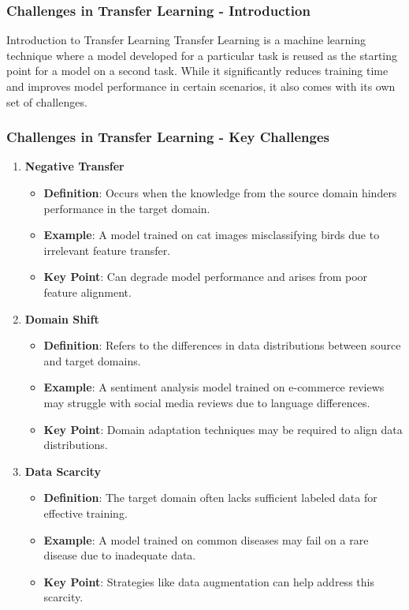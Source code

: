 \documentclass[aspectratio=169]{beamer}
\begin{document}
\begin{frame}[fragile]
  \frametitle{Challenges in Transfer Learning - Introduction}
  \begin{block}{Introduction to Transfer Learning}
    Transfer Learning is a machine learning technique where a model developed for a
    particular task is reused as the starting point for a model on a second task. 
    While it significantly reduces training time and improves model performance in
    certain scenarios, it also comes with its own set of challenges.
  \end{block}
\end{frame}

\begin{frame}[fragile]
  \frametitle{Challenges in Transfer Learning - Key Challenges}
  \begin{enumerate}
    \item \textbf{Negative Transfer}
      \begin{itemize}
        \item \textbf{Definition}: Occurs when the knowledge from the source domain
        hinders performance in the target domain.
        \item \textbf{Example}: A model trained on cat images misclassifying birds due 
        to irrelevant feature transfer.
        \item \textbf{Key Point}: Can degrade model performance and arises from poor 
        feature alignment.
      \end{itemize}
    
    \item \textbf{Domain Shift}
      \begin{itemize}
        \item \textbf{Definition}: Refers to the differences in data distributions 
        between source and target domains.
        \item \textbf{Example}: A sentiment analysis model trained on e-commerce reviews 
        may struggle with social media reviews due to language differences.
        \item \textbf{Key Point}: Domain adaptation techniques may be required to align 
        data distributions.
      \end{itemize}
    
    \item \textbf{Data Scarcity}
      \begin{itemize}
        \item \textbf{Definition}: The target domain often lacks sufficient labeled data 
        for effective training.
        \item \textbf{Example}: A model trained on common diseases may fail on a rare 
        disease due to inadequate data.
        \item \textbf{Key Point}: Strategies like data augmentation can help address 
        this scarcity.
      \end{itemize}
  \end{enumerate}
\end{frame}
\end{document}
